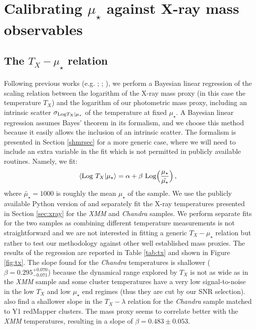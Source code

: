 \section{Calibrating $\mu_\star$ against X-ray mass observables}\label{calibsec}

\subsection{The $T_X-\mu_\star$ relation}
Following previous works (e.g. \citealt{rozo09}; \citealt{extrinsicscatter}; \citealt{mulroy}), we perform a Bayesian linear regression of the scaling relation between the logarithm of the X-ray mass proxy (in this case the temperature $T_X$) and the logarithm of our photometric mass proxy, including an intrinsic scatter $\sigma_{{\rm Log} T_X|\mu_\star}$ of the temperature at fixed $\mu_\star$. A Bayesian linear regression assumes Bayes' theorem in its formalism, and we choose this method because it easily allows the inclusion of an intrinsic scatter. The formalism is presented in Section \ref{shmrsec} for a more generic case, where we will need to include an extra variable in the fit which is not permitted in publicly available routines. Namely, we fit:
\begin{equation}
\langle {\rm Log}~ T_X|\mu_\star\rangle = \alpha+\beta~{\rm Log}\Big( \frac{\mu_\star}{\tilde{\mu_\star}} \Big)\, ,\label{eq:tx}
\end{equation}
where  $\tilde{\mu_\star}=1000$ is roughly the mean $\mu_\star$ of the sample. We use the publicly available Python version of \citealt{kelly} and separately fit the X-ray temperatures presented in Section \ref{sec:xray} for the \emph{XMM} and \emph{Chandra} samples. We perform separate fits for the two samples as combining different temperature measurements is not straightforward and we are not interested in fitting a generic $T_X-\mu_\star$ relation but rather to test our methodology against other well established mass proxies.
The results of the regression are reported in Table \ref{tab:tx} and shown in Figure \ref{fig:tx}. The slope found for the \emph{Chandra} temperatures is shallower ($\beta=0.295^{+0.070}_{-0.071}$) because the dynamical range explored by $T_X$ is not as wide as in the \emph{XMM} sample and some cluster temperatures have a very low signal-to-noise in the low $T_X$ and low $\mu_\star$ end regimes (thus they are cut by our SNR selection). \citet{farahi} also find a shallower slope in the $T_X-\lambda$ relation for the \emph{Chandra} sample matched to Y1 redMapper clusters. The mass proxy seems to correlate better with the \emph{XMM} temperatures, resulting in a slope of $\beta=0.483\pm 0.053$. 

